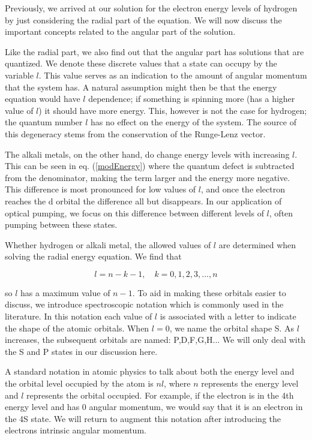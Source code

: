 \documentclass[letter,12pt]{article}
\begin{document}
        Previously, we arrived at our solution for the electron energy 
		levels
        of hydrogen by just considering the radial part of the
        equation. We will now discuss the important concepts related
        to the angular part of the solution. 
        
        Like the radial part, 
        we also find out that the angular part has solutions that 
        are quantized. We denote these discrete values that a state
		can occupy by the variable $l$. This value serves as an
		indication to the amount of angular momentum that the 
		system has. A natural assumption might then be that
		the energy equation would have $l$ dependence; if 
		something is spinning more (has a higher value 
		of $l$) it should have more energy. This, however is not
		the case for hydrogen; the quantum number $l$ has no effect on the 
		energy of the system. The source of this degeneracy stems from 
		the conservation of the Runge-Lenz vector.

		The alkali metals, on the other hand, do change energy levels with
		increasing $l$. This can be seen in eq. (\ref{modEnergy}) where 
		the quantum defect
		is subtracted from the denominator, making the term larger and the
		energy more negative.
		This difference is most pronounced for low values 
		of $l$, and once the electron reaches the d orbital the difference
		all but disappears. In our application of optical pumping,
		we focus on this difference between different levels of $l$,
		often pumping between these states.
		
		Whether hydrogen or alkali metal, the allowed values of $l$ are determined when solving
		the radial energy equation. We find that

		\begin{equation}
			l=n-k-1,\quad k=0,1,2,3,...,n
		\end{equation}

		so $l$ has a maximum value of $n-1$. To aid in making
		these orbitals easier to discuss, we introduce 
		spectroscopic notation which is commonly used in the 
		literature. In this notation
		each value of $l$ is associated with a letter to indicate
		the shape of the atomic orbitals. When $l=0$, we name the 
		orbital shape S. As $l$ increases, the subsequent orbitals
		are named: P,D,F,G,H... We will only deal with the S and P 
		states in our discussion here. 

		A standard notation in atomic physics 
        to talk about both the energy level and
		the orbital level occupied by the atom is $nl$, where $n$
		represents the energy level and $l$ represents the orbital
		occupied. For example, if the electron is in the 4th energy
		level and has 0 angular momentum, we would say that it is
		an electron in the 4S state. We will return to augment this 
		notation after introducing the electrons intrinsic angular
		momentum.
\end{document}
